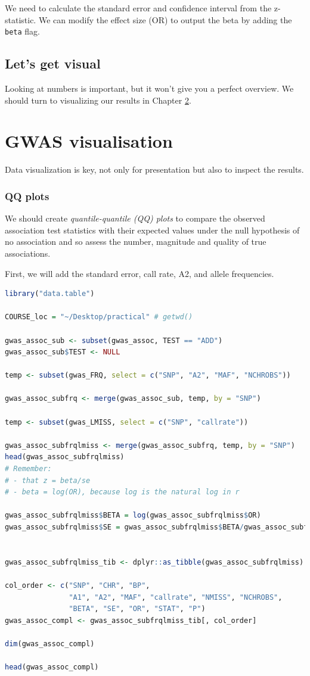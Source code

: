 \documentclass[
]{book}
\newcommand{\passthrough}[1]{#1}
\begin{document}
We need to calculate the standard error and confidence interval from the z-statistic. We can modify the effect size (OR) to output the beta by adding the \passthrough{\lstinline!beta!} flag.

\hypertarget{lets-get-visual}{%
\section{Let's get visual}\label{lets-get-visual}}

Looking at numbers is important, but it won't give you a perfect overview. We should turn to visualizing our results in Chapter \ref{gwas-visuals}.

\hypertarget{gwas-visuals}{%
\chapter{GWAS visualisation}\label{gwas-visuals}}

Data visualization is key, not only for presentation but also to inspect the results.

\hypertarget{qq-plots}{%
\subsection{QQ plots}\label{qq-plots}}

We should create \emph{quantile-quantile (QQ) plots} to compare the observed association test statistics with their expected values under the null hypothesis of no association and so assess the number, magnitude and quality of true associations.

First, we will add the standard error, call rate, A2, and allele frequencies.

\begin{lstlisting}[language=R]
library("data.table")

COURSE_loc = "~/Desktop/practical" # getwd()

gwas_assoc_sub <- subset(gwas_assoc, TEST == "ADD")
gwas_assoc_sub$TEST <- NULL

temp <- subset(gwas_FRQ, select = c("SNP", "A2", "MAF", "NCHROBS"))

gwas_assoc_subfrq <- merge(gwas_assoc_sub, temp, by = "SNP")

temp <- subset(gwas_LMISS, select = c("SNP", "callrate"))

gwas_assoc_subfrqlmiss <- merge(gwas_assoc_subfrq, temp, by = "SNP")
head(gwas_assoc_subfrqlmiss)
# Remember:
# - that z = beta/se
# - beta = log(OR), because log is the natural log in r

gwas_assoc_subfrqlmiss$BETA = log(gwas_assoc_subfrqlmiss$OR)
gwas_assoc_subfrqlmiss$SE = gwas_assoc_subfrqlmiss$BETA/gwas_assoc_subfrqlmiss$STAT


gwas_assoc_subfrqlmiss_tib <- dplyr::as_tibble(gwas_assoc_subfrqlmiss)

col_order <- c("SNP", "CHR", "BP",
               "A1", "A2", "MAF", "callrate", "NMISS", "NCHROBS",
               "BETA", "SE", "OR", "STAT", "P")
gwas_assoc_compl <- gwas_assoc_subfrqlmiss_tib[, col_order]

dim(gwas_assoc_compl)

head(gwas_assoc_compl)
\end{lstlisting}
\end{document}
